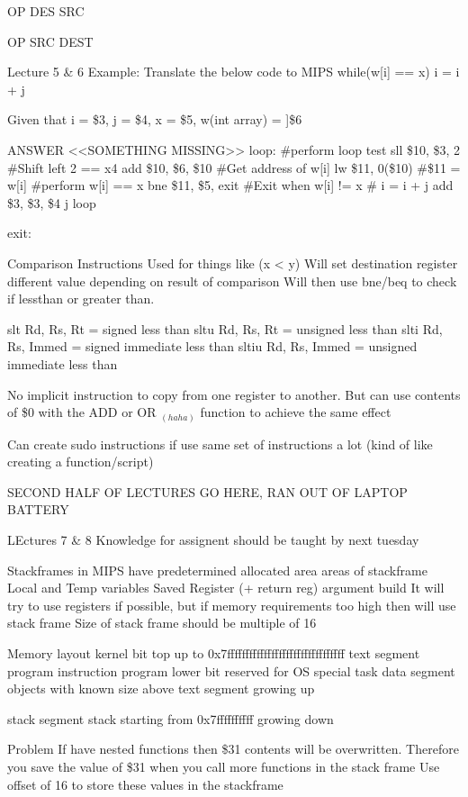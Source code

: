 \documentclass{article}
\newcommand\tab[1][0.5cm]{\hspace*{#1}}
\begin{document}
			OP DES SRC

			OP SRC DEST


Lecture 5 \& 6
	Example: Translate the below code to MIPS
		while(w[i] == x)
			i = i + j

		Given that i = \$3, j = \$4, x = \$5, w(int array) = ]\$6


		ANSWER
		<<SOMETHING MISSING>>
		loop: \#perform loop test
			sll \$10, \$3, 2 \tab \#Shift left 2 == x4
			add \$10, \$6, \$10 \tab \#Get address of w[i]
			lw \$11, 0(\$10) \tab \#\$11 = w[i]
			\#perform w[i] == x
			bne \$11, \$5, exit \tab \#Exit when w[i] != x
			\# i = i + j
			add \$3, \$3, \$4
			j loop

		exit:

	Comparison Instructions
		Used for things like (x < y)
		Will set destination register different value depending on result of comparison
		Will then use bne/beq to check if lessthan or greater than.

		slt Rd, Rs, Rt = signed less than
		sltu Rd, Rs, Rt = unsigned less than
		slti Rd, Rs, Immed  = signed immediate less than
		sltiu Rd, Rs, Immed  = unsigned immediate less than

		No implicit instruction to copy from one register to another. But can use contents of \$0 with the ADD or OR $_{(haha)}$ function to achieve the same effect

		Can create sudo instructions if use same set of instructions a lot (kind of like creating a function/script)


	SECOND HALF OF LECTURES GO HERE, RAN OUT OF LAPTOP BATTERY

LEctures 7 \& 8
	Knowledge for assignent should be taught by next tuesday

	Stackframes
		in MIPS have predetermined allocated area
		areas of stackframe
			Local and Temp variables
			Saved Register (+ return reg)
			argument build
		It will try to use registers if possible, but if memory requirements too high then will use stack frame
		Size of stack frame should be multiple of 16

	Memory layout
		kernel bit
			top up to 0x7ffffffffffffffffffffffffffffffff
		text segment
			program instruction program
			lower bit reserved for OS special task
		data segment
			objects with known size
			above text segment growing up

		stack segment
			stack starting from 0x7ffffffffff growing down

		Problem 
			If have nested functions then \$31 contents will be overwritten. Therefore you save the value of \$31 when you call more functions in the stack frame
			Use offset of 16 to store these values in the stackframe
\end{document}
